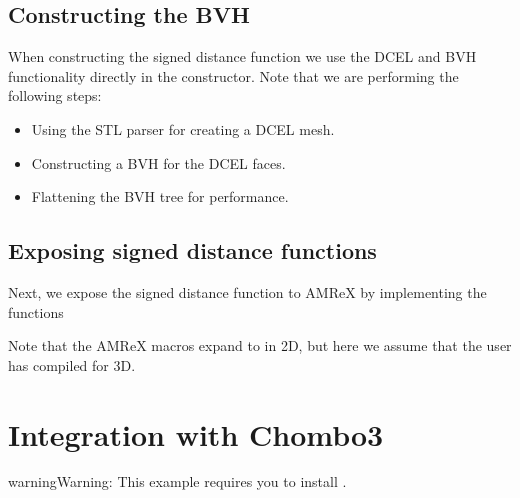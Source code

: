 \documentclass[letterpaper,10pt,english]{sphinxmanual}
\begin{document}
\subsection{Constructing the BVH}
\label{\detokenize{Example_AMReX:constructing-the-bvh}}
\sphinxAtStartPar
When constructing the signed distance function we use the DCEL and BVH functionality directly in the constructor.
Note that we are performing the following steps:
\begin{itemize}
\item {} 
\sphinxAtStartPar
Using the STL parser for creating a DCEL mesh.

\item {} 
\sphinxAtStartPar
Constructing a BVH for the DCEL faces.

\item {} 
\sphinxAtStartPar
Flattening the BVH tree for performance.

\end{itemize}


\subsection{Exposing signed distance functions}
\label{\detokenize{Example_AMReX:exposing-signed-distance-functions}}
\sphinxAtStartPar
Next, we expose the signed distance function to AMReX by implementing the functions

\begin{sphinxVerbatim}[commandchars=\\\{\}]
        
\end{sphinxVerbatim}

\sphinxAtStartPar
Note that the AMReX  macros expand to  in 2D, but here we assume that the user has compiled for 3D.

\sphinxstepscope


\section{Integration with Chombo3}
\label{\detokenize{Example_Chombo3:integration-with-chombo3}}\label{\detokenize{Example_Chombo3::doc}}
\begin{sphinxadmonition}{warning}{Warning:}
\sphinxAtStartPar
This example requires you to install .
\end{sphinxadmonition}
\end{document}
